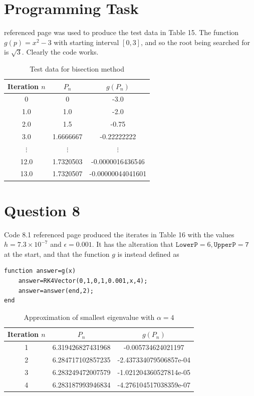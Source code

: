 \documentclass[10pt,a4paper,notitlepage]{article}
\begin{document}
\section*{\centering \large Programming Task}
 referenced page \pageref{subsec:Code 8.1} was used to produce the test data in Table 15.  The function $g(p)=x^{2}-3$ with starting interval $[0,3]$, and so the root being searched for is $\sqrt{3}$.  Clearly the code works.
\begin{table}[H]
\centering
\begin{tabular}{|c|c|c|}
\hline 
Iteration $n$ & $P_{n}$ & $g(P_{n})$ \\ 
\hline 
0 & 0 & -3.0\\ 1.0 & 1.0 & -2.0\\ 2.0 & 1.5 & -0.75\\ 3.0 & 1.6666667 & -0.22222222\\ $\vdots$&$\vdots$&$\vdots$\\ 12.0 & 1.7320503 & -0.0000016436546\\ 13.0 & 1.7320507 & -0.00000044041601\\
\hline 
\end{tabular} 
\caption{Test data for bisection method}
\end{table}
\section*{\centering \large Question 8}
Code 8.1 referenced page \pageref{subsec:Code 8.1} produced the iterates in Table 16 with the values $h=7.3\times 10^{-7}$ and $\epsilon=0.001$. It has the alteration that $\mathtt{LowerP}=6, \mathtt{UpperP=7}$ at the start, and that the function $g$ is instead defined as

\begin{verbatim}
function answer=g(x)
    answer=RK4Vector(0,1,0,1,0.001,x,4);
    answer=answer(end,2);
end
\end{verbatim}

\begin{table}[H]
\centering
\begin{tabular}{|c|c|c|}
\hline Iteration $n$& $P_{n}$ & $g(P_{n})$\\ \hline
1 & 6.319426827431968 & -0.005734624021197 \\
2 & 6.284717102857235 & -2.437334079506857e-04 \\
3 & 6.283249472007579 & -1.021204360527814e-05 \\
4 & 6.283187993946834 & -4.276104517038359e-07 \\
\hline \end{tabular}
\caption{Approximation of smallest eigenvalue with $\alpha=4$}
\end{table}
\end{document}
